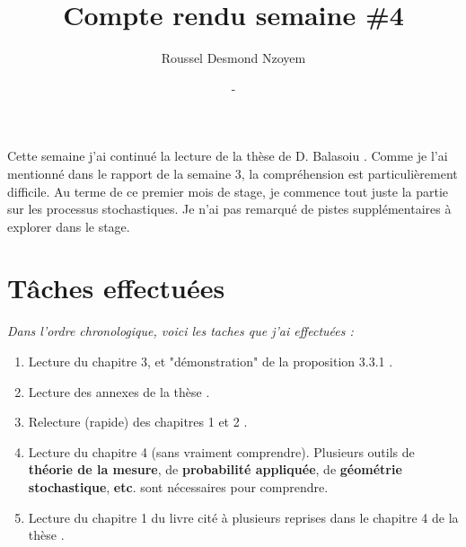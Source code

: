 \documentclass[
  french,
	11pt, %
]{fphw}
\title{Compte rendu semaine \#4} %
\author{Roussel Desmond Nzoyem} %
\date{\DTMdisplaydate{2021}{2}{24}{-1} - \DTMdisplaydate{2021}{3}{2}{-1}} %
\institute{Sorbonne Université \\ Laboratoire Jacques-Louis Lions} %
\begin{document}
\maketitle %



Cette semaine j'ai continué la lecture de la thèse de D. Balasoiu \parencite{balasoiu2020halthesis}. Comme je l'ai mentionné dans le rapport de la semaine 3, la compréhension est particulièrement difficile. Au terme de ce premier mois de stage, je commence tout juste la partie sur les processus stochastiques. Je n'ai pas remarqué de pistes supplémentaires à explorer dans le stage.



\section{Tâches effectuées}

\textit{Dans l'ordre chronologique, voici les taches que j'ai effectuées :}
\begin{enumerate}
  \item Lecture du chapitre 3, et "démonstration" de la proposition 3.3.1 \parencite[p.93]{balasoiu2020halthesis}.
  \item Lecture des annexes de la thèse \parencite{balasoiu2020halthesis}.
  \item Relecture (rapide) des chapitres 1 et 2 \parencite{balasoiu2020halthesis}.
  \item Lecture du chapitre 4 (sans vraiment comprendre). Plusieurs outils de \textbf{théorie de la mesure}, de \textbf{probabilité appliquée}, de \textbf{géométrie stochastique}, \textbf{etc}. sont nécessaires pour comprendre. 
  \item Lecture du chapitre 1 du livre \parencite{chiu2013stochastic} cité à plusieurs reprises dans le chapitre 4 de la thèse \parencite{balasoiu2020halthesis}. 
\end{enumerate}

\end{document}
